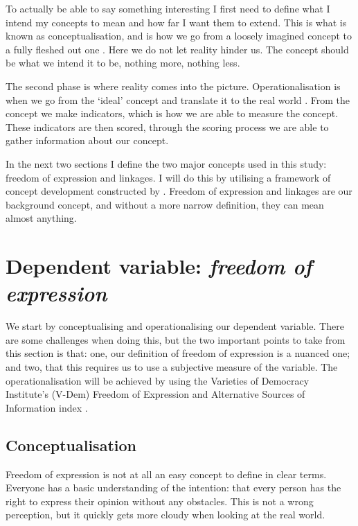 To actually be able to say something interesting I first need to define what I intend my concepts to mean and how far I want them to extend. This is what is known as conceptualisation, and is how we go from a loosely imagined concept to a fully fleshed out one \citep{adcock_measurement_2001, gerring_what_1999}. Here we do not let reality hinder us. The concept should be what we intend it to be, nothing more, nothing less. 

The second phase is where reality comes into the picture. Operationalisation is when we go from the `ideal' concept and translate it to the real world \citep{adcock_measurement_2001}.  From the concept we make indicators, which is how we are able to measure the concept. These indicators are then scored, through the scoring process we are able to gather information about our concept. 

In the next two sections I define the two major concepts used in this study: freedom of expression and linkages. I will do this by utilising a framework of concept development constructed by \citet{adcock_measurement_2001}. Freedom of expression and  linkages are our background concept, and without a more narrow definition, they can mean almost anything.

\section{Dependent variable: \textit{freedom of expression}}
We start by conceptualising and operationalising our dependent variable. There are some challenges when doing this, but the two important points to take from this section is that: one, our definition of freedom of expression is a nuanced one; and two, that this requires us to use a subjective measure of the variable. The operationalisation will be achieved by using the Varieties of Democracy Institute's (V-Dem) Freedom of Expression and Alternative Sources of Information index \citep{coppedge_v-dem_2025}. 

\subsection{Conceptualisation}
Freedom of expression is not at all an easy concept to define in clear terms. Everyone has a basic understanding of the intention: that every person has the right to express their opinion without any obstacles. This is not a wrong perception, but it quickly gets more cloudy when looking at the real world.

